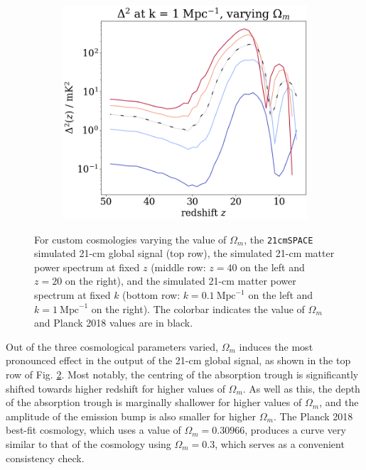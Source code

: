 \documentclass[floats,floatfix,showpacs,amssymb,prd,superscriptaddress,nofootinbib]{revtex4-2} %
\newcommand{\code}{\texttt}
\begin{document}
\begin{figure}[H]
\begin{subfigure}[b]{0.45\textwidth}
     \end{subfigure}
     \hfill
     \begin{subfigure}[b]{0.45\textwidth}
         \centering
         \includegraphics[width=\textwidth]{images/simulation_results/power_spectrum_fixed_k_1_Om.png}
         \label{fig:power_spectrum_fixed_k_1_Om}
     \end{subfigure}
        \caption{For custom cosmologies varying the value of $\Omega_m$, the \code{21cmSPACE} simulated 21-cm global signal (top row), the simulated 21-cm matter power spectrum at fixed $z$ (middle row: $z = 40$ on the left and $z = 20$ on the right), and the simulated 21-cm matter power spectrum at fixed $k$ (bottom row: $k = 0.1 ~\text{Mpc}^{-1}$ on the left and $k = 1 ~\text{Mpc}^{-1}$ on the right). The colorbar indicates the value of $\Omega_m$ and Planck 2018 values are in black.}
        \label{fig:simulation_results_Om}
\end{figure}


Out of the three cosmological parameters varied, $\Omega_m$ induces the most pronounced effect in the output of the 21-cm global signal, as shown in the top row of Fig. \ref{fig:simulation_results_Om}. Most notably, the centring of the absorption trough is significantly shifted towards higher redshift for higher values of $\Omega_m$. As well as this, the depth of the absorption trough is marginally shallower for higher values of $\Omega_m$, and the amplitude of the emission bump is also smaller for higher $\Omega_m$. The Planck 2018 best-fit cosmology, which uses a value of $\Omega_m = 0.30966$, produces a curve very similar to that of the cosmology using $\Omega_m = 0.3$, which serves as a convenient consistency check. 
\end{document}
